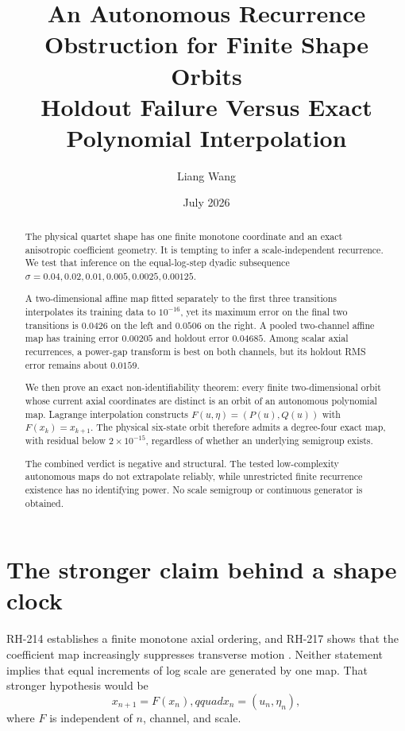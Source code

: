 \documentclass[12pt]{article}
\title{An Autonomous Recurrence Obstruction for Finite Shape Orbits\\
\large Holdout Failure Versus Exact Polynomial Interpolation}
\author{Liang Wang}\date{July 2026}
\theoremstyle{remark}\newtheorem{remark}[theorem]{Remark}
\begin{document}
\maketitle
\begin{abstract}
The physical quartet shape has one finite monotone coordinate and an exact
anisotropic coefficient geometry.  It is tempting to infer a
scale-independent recurrence.  We test that inference on the equal-log-step
dyadic subsequence
$\sigma=0.04,0.02,0.01,0.005,0.0025,0.00125$.

A two-dimensional affine map fitted separately to the first three
transitions interpolates its training data to $10^{-16}$, yet its maximum
error on the final two transitions is $0.0426$ on the left and $0.0506$ on
the right.  A pooled two-channel affine map has training error $0.00205$ and
holdout error $0.04685$.  Among scalar axial recurrences, a power-gap
transform is best on both channels, but its holdout RMS error remains about
$0.0159$.

We then prove an exact non-identifiability theorem: every finite
two-dimensional orbit whose current axial coordinates are distinct is an
orbit of an autonomous polynomial map.  Lagrange interpolation constructs
$F(u,\eta)=(P(u),Q(u))$ with $F(x_k)=x_{k+1}$.  The physical six-state orbit
therefore admits a degree-four exact map, with residual below $2\times10^{-15}$,
regardless of whether an underlying semigroup exists.

The combined verdict is negative and structural.  The tested low-complexity
autonomous maps do not extrapolate reliably, while unrestricted finite
recurrence existence has no identifying power.  No scale semigroup or
continuous generator is obtained.
\end{abstract}

\section{The stronger claim behind a shape clock}

RH-214 establishes a finite monotone axial ordering, and RH-217 shows that
the coefficient map increasingly suppresses transverse motion
\citep{WangRH214,WangRH217}.  Neither statement implies that equal increments
of log scale are generated by one map.  That stronger hypothesis would be
\begin{equation}\label{eq:autonomous}
 x_{n+1}=F(x_n),qquad x_n=(u_n,\eta_n),
\end{equation}
where $F$ is independent of $n$, channel, and scale.
\end{document}
